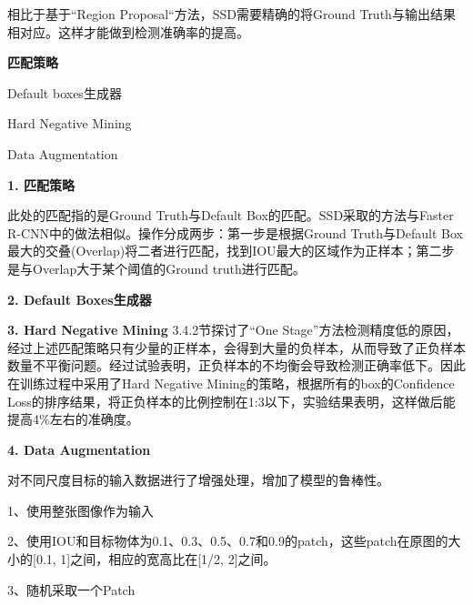 相比于基于“Region Proposal“方法，SSD需要精确的将Ground Truth与输出结果相对应。这样才能做到检测准确率的提高。

\textbf{匹配策略}

\line

Default boxes生成器

Hard Negative Mining

Data Augmentation

\line

\textbf{1. 匹配策略}

此处的匹配指的是Ground Truth与Default Box的匹配。SSD采取的方法与Faster R-CNN中的做法相似。操作分成两步：第一步是根据Ground Truth与Default Box最大的交叠(Overlap)将二者进行匹配，找到IOU最大的区域作为正样本；第二步是与Overlap大于某个阈值的Ground truth进行匹配。

\textbf{2. Default Boxes生成器}

\textbf{3. Hard Negative Mining}
3.4.2节探讨了“One Stage”方法检测精度低的原因，经过上述匹配策略只有少量的正样本，会得到大量的负样本，从而导致了正负样本数量不平衡问题。经过试验表明，正负样本的不均衡会导致检测正确率低下\cite{focal-loss}。因此在训练过程中采用了Hard Negative Mining\cite{hnm}的策略，根据所有的box的Confidence Loss的排序结果，将正负样本的比例控制在1:3以下，实验结果表明，这样做后能提高4\%左右的准确度。

\textbf{4. Data Augmentation}

对不同尺度目标的输入数据进行了增强处理，增加了模型的鲁棒性。

1、使用整张图像作为输入

2、使用IOU和目标物体为0.1、0.3、0.5、0.7和0.9的patch，这些patch在原图的大小的[0.1, 1]之间，相应的宽高比在[1/2, 2]之间。

3、随机采取一个Patch

